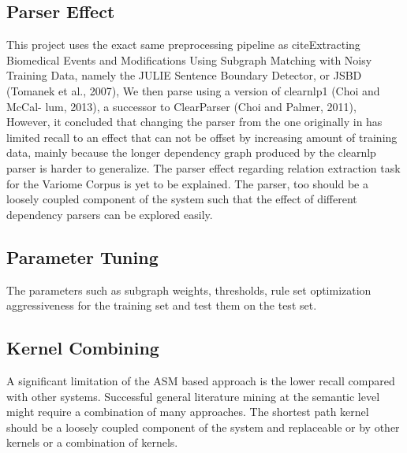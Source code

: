 \subsection{Parser Effect}
This project uses the exact same preprocessing pipeline as
cite{Extracting Biomedical Events and Modifications Using Subgraph Matching with Noisy Training Data, namely the JULIE Sentence Boundary Detector, or JSBD (Tomanek et al., 2007), We then parse using a version of clearnlp1 (Choi and McCal- lum, 2013), a successor to ClearParser (Choi and Palmer, 2011),  However, it
} concluded that changing the parser from the one originally in \cite{liu2013approximate} has limited recall to an effect that can not be offset by increasing amount of training data, mainly because the longer dependency graph produced by the clearnlp parser is harder to generalize. The parser effect regarding relation extraction task for the Variome Corpus is yet to be explained. The parser, too should be a loosely coupled component of the system such that the effect of different dependency parsers can be explored easily.  
\subsection{Parameter Tuning}
The parameters such as subgraph weights, thresholds,  rule set optimization aggressiveness for the training set and test them on the test set. 
\subsection{Kernel Combining}
A significant limitation of the ASM based approach is the lower recall compared with other systems. 
Successful general literature mining at the semantic level might require a combination of many approaches. The shortest path kernel should be a loosely coupled component of the system and replaceable or by other kernels or a combination of kernels. 

